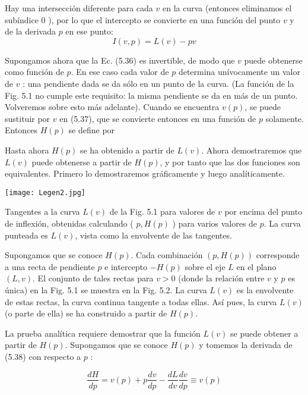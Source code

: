 Hay una intersección diferente para cada $v$ en la curva (entonces eliminamos el subíndice 0 ), por lo que el intercepto se convierte en una función del punto $v$ y de la derivada $p$ en ese punto:
\begin{equation*}
  I(v, p)=L(v)-p v \tag{5.37}
  \end{equation*}

  Supongamos ahora que la Ec. (5.36) es invertible, de modo que $v$ puede obtenerse como función de $p$. En ese caso cada valor de $p$ determina unívocamente un valor de $v$ : una pendiente dada se da sólo en un punto de la curva. (La función de la Fig. 5.1 no cumple este requisito: la misma pendiente se da en más de un punto. Volveremos sobre esto más adelante). Cuando se encuentra $v(p)$, se puede sustituir por $v$ en (5.37), que se convierte entonces en una función de $p$ solamente. Entonces $H(p)$ se define por

  Hasta ahora $H(p)$ se ha obtenido a partir de $L(v)$. Ahora demostraremos que $L(v)$ puede obtenerse a partir de $H(p)$, y por tanto que las dos funciones son equivalentes. Primero lo demostraremos gráficamente y luego analíticamente.

  \begin{marginfigure}[]
    \texttt{[image: Legen2.jpg]}
    \caption[]{Tangentes a la curva $L(v)$ de la Fig. 5.1 para valores de $v$ por encima del punto de inflexión, obtenidas calculando ( $p, H(p)$ ) para varios valores de $p$. La curva punteada es $L(v)$, vista como la envolvente de las tangentes.}
  \end{marginfigure}


  Supongamos que se conoce $H(p)$. Cada combinación $(p, H(p))$ corresponde a una recta de pendiente $p$ e intercepto $-H(p)$ sobre el eje $L$ en el plano $(L, v)$. El conjunto de tales rectas para $v>0$ (donde la relación entre $v$ y $p$ es única) en la Fig. 5.1 se muestra en la Fig. 5.2. La curva $L(v)$ es la envolvente de estas rectas, la curva continua tangente a todas ellas. Así pues, la curva $L(v)$ (o parte de ella) se ha construido a partir de $H(p)$.

  La prueba analítica requiere demostrar que la función $L(v)$ se puede obtener a partir de $H(p)$. Supongamos que se conoce $H(p)$ y tomemos la derivada de (5.38) con respecto a $p$ :

  \begin{equation*}
    \frac{d H}{d p}=v(p)+p \frac{d v}{d p}-\frac{d L}{d v} \frac{d v}{d p} \equiv v(p) \tag{5.39}
    \end{equation*}

